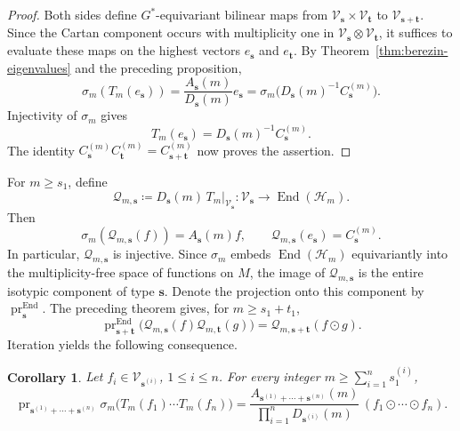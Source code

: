 \documentclass[11pt,reqno]{amsart}
\theoremstyle{corollary}
\newtheorem{corollary}[theorem]{Corollary}
\theoremstyle{conjecture}
\theoremstyle{assumption}
\theoremstyle{proposition}
\theoremstyle{remark}
\numberwithin{equation}{section}
\begin{document}
\begin{proof}
Both sides define $G^*$-equivariant bilinear maps from $\mathcal V_{\mathbf s}\times\mathcal V_{\mathbf t}$ to $\mathcal V_{\mathbf s+\mathbf t}$. Since the Cartan component occurs with multiplicity one in $\mathcal V_{\mathbf s}\otimes\mathcal V_{\mathbf t}$, it suffices to evaluate these maps on the highest vectors $e_{\mathbf s}$ and $e_{\mathbf t}$. By Theorem~\ref{thm:berezin-eigenvalues} and the preceding proposition,
\[
\sigma_m(T_m(e_{\mathbf s}))=\frac{A_{\mathbf s}(m)}{D_{\mathbf s}(m)}e_{\mathbf s}=\sigma_m\bigl(D_{\mathbf s}(m)^{-1}C_{\mathbf s}^{(m)}\bigr).
\]
Injectivity of $\sigma_m$ gives
\[
T_m(e_{\mathbf s})=D_{\mathbf s}(m)^{-1}C_{\mathbf s}^{(m)}.
\]
The identity $C_{\mathbf s}^{(m)}C_{\mathbf t}^{(m)}=C_{\mathbf s+\mathbf t}^{(m)}$ now proves the assertion.
\end{proof}
For $m\geq s_1$, define
\[
\mathcal Q_{m,\mathbf s}\coloneq D_{\mathbf s}(m)\,T_m|_{\mathcal V_{\mathbf s}}\colon\mathcal V_{\mathbf s}\longrightarrow\operatorname{End}(\mathcal H_m).
\]
Then
\begin{equation}\label{eq:pre-fixed-symbol}
\sigma_m(\mathcal Q_{m,\mathbf s}(f))=A_{\mathbf s}(m)f,\qquad \mathcal Q_{m,\mathbf s}(e_{\mathbf s})=C_{\mathbf s}^{(m)}.
\end{equation}
In particular, $\mathcal Q_{m,\mathbf s}$ is injective. Since $\sigma_m$ embeds $\operatorname{End}(\mathcal H_m)$ equivariantly into the multiplicity-free space of functions on $M$, the image of $\mathcal Q_{m,\mathbf s}$ is the entire isotypic component of type $\mathbf s$. Denote the projection onto this component by $\operatorname{pr}^{\operatorname{End}}_{\mathbf s}$. The preceding theorem gives, for $m\geq s_1+t_1$,
\begin{equation}\label{eq:pre-fixed-product}
\operatorname{pr}^{\operatorname{End}}_{\mathbf s+\mathbf t}\bigl(\mathcal Q_{m,\mathbf s}(f)\mathcal Q_{m,\mathbf t}(g)\bigr)=\mathcal Q_{m,\mathbf s+\mathbf t}(f\odot g).
\end{equation}
Iteration yields the following consequence.
\begin{corollary}\label{thm:interated-exact-cartan}
Let $f_i\in\mathcal V_{\mathbf s^{(i)}}$, $1\leq i\leq n$. For every integer $m\geq\sum_{i=1}^n s^{(i)}_1$,
\[
\operatorname{pr}_{\mathbf s^{(1)}+\cdots+\mathbf s^{(n)}}\sigma_m\bigl(T_m(f_1)\cdots T_m(f_n)\bigr)=\frac{A_{\mathbf s^{(1)}+\cdots+\mathbf s^{(n)}}(m)}{\prod_{i=1}^n D_{\mathbf s^{(i)}}(m)}\,(f_1\odot\cdots\odot f_n).
\]
\end{corollary}
\end{document}
